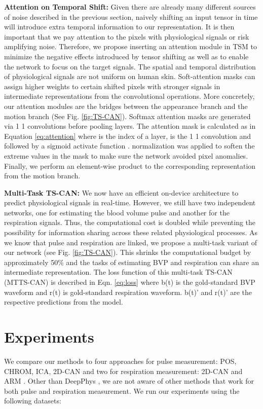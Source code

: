 \documentclass{article}
\begin{document}
\textbf{Attention on Temporal Shift:} 
Given there are already many different sources of noise described in the previous section, naively shifting an input tensor in time will introduce extra temporal information to our representation. It is then important that we pay attention to the pixels with physiological signals or risk amplifying noise. Therefore, we propose inserting an attention module in TSM to minimize the negative effects introduced by tensor shifting as well as to enable the network to focus on the target signals.
The spatial and temporal distribution of physiological signals are not uniform on human skin. Soft-attention masks can assign higher weights to certain shifted pixels with stronger signals in intermediate representations from the convolutional operations. More concretely, our attention modules are the bridges between the appearance branch and the motion branch (See Fig. \ref{fig:TS-CAN}). Softmax attention masks are generated via 1  1 convolutions before pooling layers. The attention mask is calculated as in Equation \ref{eq:attention} where  is the index of a layer,    is the  1  1 convolution and followed by a sigmoid activate function .  normalization was applied to soften the extreme values in the mask to make sure the network avoided pixel anomalies. Finally, we perform an element-wise product to the corresponding representation  from the motion branch. 



\textbf{Multi-Task TS-CAN:}
We now have an efficient on-device architecture to predict physiological signals in real-time. However, we still have two independent networks, one for estimating the blood volume pulse and another for the respiration signals. Thus, the computational cost is doubled while preventing the possibility for information sharing across these related physiological processes.
As we know that pulse and respiration are linked, we propose a multi-task variant of our network (see Fig. \ref{fig:TS-CAN}). This shrinks the computational budget by approximately 50\% and the tasks of estimating BVP and respiration can share an intermediate representation. The loss function of this multi-task TS-CAN (MTTS-CAN) is described in Eqn. \ref{eq:loss} where b(t) is the gold-standard BVP waveform and r(t) is gold-standard respiration waveform. b(t)' and r(t)' are the respective predictions from the model. 


\section{Experiments}
\vspace{-1mm}
We compare our methods to four approaches for pulse measurement: POS\citep{wang2016algorithmic}, CHROM\citep{de2013robust}, ICA\citep{poh2010advancements}, 2D-CAN\citep{chen2018deepphys} and two for respiration measurement: 2D-CAN and ARM \citep{tarassenko2014non}. Other than DeepPhys \cite{chen2018deepphys}, we are not aware of other methods that work for both pulse and respiration measurement. We run our experiments using the following datasets: 
\end{document}
